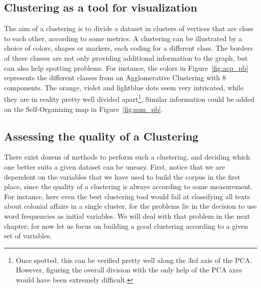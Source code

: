 \documentclass[a4paper,11pt]{article}
\begin{document}
\subsection*{Clustering as a tool for visualization}

The aim of a clustering is to divide a dataset in clusters of vertices that are close to each other, according to some metrics. A clustering can be illustrated by a choice of colors, shapes or markers, each coding for a different class. The borders of these classes are not only providing additional information to the graph, but can also help spotting problems. For instance, the colors in Figure~\ref{fig:acp_pb} represents the different classes from an Agglomerative Clustering with 8 components. The orange, violet and lightblue dots seem very intricated, while they are in reality pretty well divided apart\footnote{Once spotted, this can be verified pretty well along the 3rd axis of the PCA. However, figuring the overall division with the only help of the PCA axes would have been extremely difficult.}. Similar information could be added on the Self-Organizing map in Figure~\ref{fig:som_pb}.

\subsection*{Assessing the quality of a Clustering}

There exist dozens of methods to perform such a clustering, and deciding which one better suits a given dataset can be uneasy. First, notice that we are dependent on the variables that we have used to build the corpus in the first place, since the quality of a clustering is always according to some measurement. For instance, here even the best clustering tool would fail at classifying all texts about colonial affairs in a single cluster, for the problems lie in the decision to use word frequencies as initial variables. We will deal with that problem in the next chapter; for now let us focus on building a good clustering according to a given set of variables.
\end{document}
